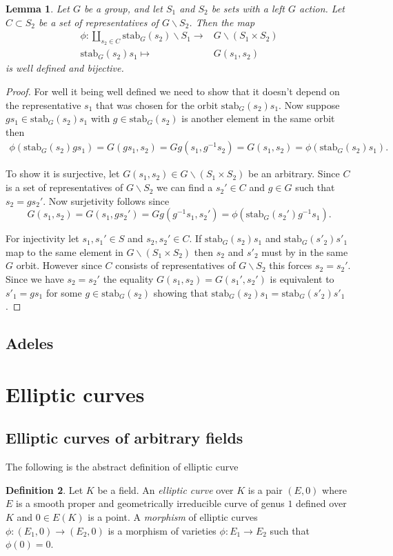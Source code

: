\documentclass[a4paper,12pt,reqno]{amsart}
\newcommand{\stab}[2]{\text{stab}_{#1}(#2)}
\newtheorem{lemma}{Lemma}
\theoremstyle{definition}
\newtheorem{definition}[lemma]{Definition}
\numberwithin{lemma}{section}
\numberwithin{equation}{section}
\numberwithin{figure}{section}
\begin{document}
\begin{lemma}
	Let $G$ be a group, and let $S_1$ and $S_2$ be sets with a left $G$ action. Let $C \subset S_2$ be a set of representatives of $G\backslash S_2$.
	Then the map \begin{align*}
	\phi : \coprod_{s_2 \in C} \stab{G}{s_2}\backslash S_1 \to& G \backslash(S_1 \times S_2)\\
	 \stab{G}{s_2}s_1\mapsto& G(s_1,s_2)
	\end{align*}
	is well defined and bijective.
\end{lemma}
\begin{proof}
For well it being well defined we need to show that it doesn't depend on the representative $s_1$ that was chosen for the orbit $\stab{G}{s_2}s_1$. Now suppose $gs_1 \in \stab{G}{s_2}s_1$ with $g \in \stab{G}{s_2}$ is another element in the same orbit then \begin{align*}\phi(\stab{G}{s_2}gs_1) = G(gs_1,s_2)=Gg(s_1,g^{-1}s_2)=G(s_1,s_2)=\phi(\stab{G}{s_2}s_1). \end{align*}

To show it is surjective, let $G(s_1,s_2) \in G\backslash(S_1 \times S_2)$ be an arbitrary. Since $C$ is a set of representatives of $G\backslash S_2$ we can find a $s_2' \in C$ and $g \in G$ such that $s_2=gs_2'$. Now surjetivity follows since $$G(s_1,s_2)=G(s_1,gs_2')=Gg(g^{-1}s_1,s_2') =  \phi(\stab{G}{s_2'}g^{-1}s_1).$$

For injectivity let $s_1, s_1' \in S$ and $s_2, s_2' \in C$. If  $\stab{G}{s_2}s_1$ and $\stab{G}{s'_2}s'_1$ map to the same element in $G\backslash(S_1 \times S_2)$ then $s_2$ and $s'_2$ must by in the same $G$ orbit. However since $C$ consists of representatives of $G \backslash S_2$ this forces $s_2 = s_2'$. Since we have $s_2=s_2'$ the equality $G(s_1,s_2) = G(s_1',s_2')$ is equivalent to $s'_1=gs_1$ for some $g \in \stab{G}{s_2}$ showing that $\stab{G}{s_2}s_1=\stab{G}{s'_2}s'_1$.
\end{proof}

\subsection{Adeles}

\section{Elliptic curves}

\subsection{Elliptic curves of arbitrary fields}
The following is the abstract definition of elliptic curve
\begin{definition}\label{def:ec-over-K}
Let $K$ be a field. An \textit{elliptic curve} over $K$ is a pair $(E,0)$ where $E$ is a smooth proper and geometrically irreducible curve of genus $1$ defined over $K$ and $0 \in E(K)$ is a point. A \textit{morphism} of elliptic curves $\phi:  (E_1,0) \to (E_2,0)$ is a morphism of varieties $\phi: E_1 \to E_2$ such that $\phi(0)=0$.
\end{definition}
\end{document}
